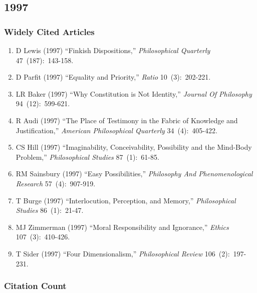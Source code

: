 \documentclass[
  10pt,
  letterpaper,
  DIV=11,
  numbers=noendperiod,
  twoside]{scrartcl}
\providecommand{\tightlist}{%
  \setlength{\itemsep}{0pt}\setlength{\parskip}{0pt}}\usepackage{longtable,booktabs,array}
\begin{document}
\newpage

\subsection{1997}\label{sec-s1997}

\subsubsection*{Widely Cited Articles}\label{widely-cited-articles-41}

\begin{enumerate}
\def\labelenumi{\arabic{enumi}.}
\tightlist
\item
  D Lewis (1997) ``Finkish Dispositions,'' \emph{Philosophical
  Quarterly} 47~(187):~143-158.
\item
  D Parfit (1997) ``Equality and Priority,'' \emph{Ratio}
  10~(3):~202-221.
\item
  LR Baker (1997) ``Why Constitution is Not Identity,'' \emph{Journal Of
  Philosophy} 94~(12):~599-621.
\item
  R Audi (1997) ``The Place of Testimony in the Fabric of Knowledge and
  Justification,'' \emph{American Philosophical Quarterly}
  34~(4):~405-422.
\item
  CS Hill (1997) ``Imaginability, Conceivability, Possibility and the
  Mind-Body Problem,'' \emph{Philosophical Studies} 87~(1):~61-85.
\item
  RM Sainsbury (1997) ``Easy Possibilities,'' \emph{Philosophy And
  Phenomenological Research} 57~(4):~907-919.
\item
  T Burge (1997) ``Interlocution, Perception, and Memory,''
  \emph{Philosophical Studies} 86~(1):~21-47.
\item
  MJ Zimmerman (1997) ``Moral Responsibility and Ignorance,''
  \emph{Ethics} 107~(3):~410-426.
\item
  T Sider (1997) ``Four Dimensionalism,'' \emph{Philosophical Review}
  106~(2):~197-231.
\end{enumerate}

\subsubsection*{Citation Count}\label{sec-count-1997}
\end{document}
